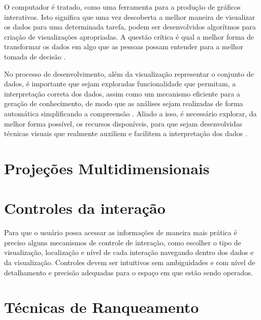 O computador é tratado,  como uma ferramenta para a produção de gráficos interativos. Isto significa que uma vez descoberta a melhor maneira de visualizar os dados para uma determinada tarefa, podem ser desenvolvidos algorítmos para criação de visualizações apropriadas. A questão crítica é qual a melhor forma de transformar os dados em algo que as pessoas possam entender para a melhor tomada de decisão \cite{ware2012information}.

No processo de desenvolvimento, além da visualização representar o conjunto de dados, é importante que sejam exploradas funcionalidade que permitam, a interpretação correta dos dados, assim como um mecanismo eficiente para a geração de conhecimento, de modo que as análises sejam realizadas de forma automática simplificando a compreensão \cite{keim2006challenges}. Aliado a isso, é necessário explorar, da melhor forma possível, os recursos disponíveis, para que sejam desenvolvidas técnicas visuais que realmente auxiliem e facilitem a interpretação dos dados \cite{keim2006challenges}.



\section{Projeções Multidimensionais}
\label{Projecoes-multidimensionais-sec}


\section{Controles da interação}

Para que o usuário possa acessar as informações de maneira mais prática é preciso alguns mecanismos de controle de interação, como escolher o tipo de visualização, localização e nível de cada interação navegando dentro dos dados e da visualização. Controles devem ser intuitivos sem ambiguidades e com nível de detalhamento e precisão adequadas para o espaço em que estão sendo operados\cite{ward2015interactive}. 

%
%

\section{Técnicas de Ranqueamento}

